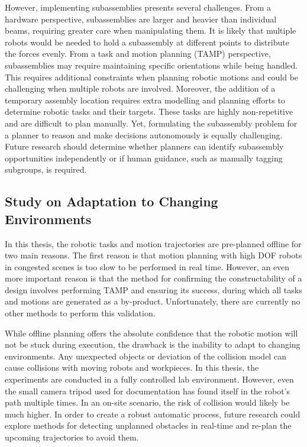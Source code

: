 However, implementing subassemblies presents several challenges. From a hardware perspective, subassemblies are larger and heavier than individual beams, requiring greater care when manipulating them. It is likely that multiple robots would be needed to hold a subassembly at different points to distribute the forces evenly. From a task and motion planning (TAMP) perspective, subassemblies may require maintaining specific orientations while being handled. This requires additional constraints when planning robotic motions and could be challenging when multiple robots are involved. Moreover, the addition of a temporary assembly location requires extra modelling and planning efforts to determine robotic tasks and their targets. These tasks are highly non-repetitive and are difficult to plan manually. Yet, formulating the subassembly problem for a planner to reason and make decisions autonomously is equally challenging. Future research should determine whether planners can identify subassembly opportunities independently or if human guidance, such as manually tagging subgroups, is required.

\subsection{Study on Adaptation to Changing Environments}
\label{subsection:study-on-adaptation-to-changing-environments}

In this thesis, the robotic tasks and motion trajectories are pre-planned offline for two main reasons. The first reason is that motion planning with high DOF robots in congested scenes is too slow to be performed in real time. However, an even more important reason is that the method for confirming the constructability of a design involves performing TAMP and ensuring its success, during which all tasks and motions are generated as a by-product. Unfortunately, there are currently no other methods to perform this validation. 

While offline planning offers the absolute confidence that the robotic motion will not be stuck during execution, the drawback is the inability to adapt to changing environments. Any unexpected objects or deviation of the collision model can cause collisions with moving robots and workpieces. In this thesis, the experiments are conducted in a fully controlled lab environment. However, even the small camera tripod used for documentation has found itself in the robot's path multiple times. In an on-site scenario, the risk of collision would likely be much higher. In order to create a robust automatic process, future research could explore methods for detecting unplanned obstacles in real-time and re-plan the upcoming trajectories to avoid them.

